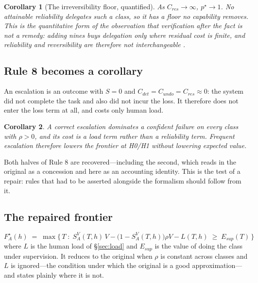 \documentclass[11pt]{article}
\newtheorem{corollary}{Corollary}
\theoremstyle{definition}
\newcommand{\pstar}{\ensuremath{p^{\star}}}
\begin{document}
\begin{corollary}[The irreversibility floor, quantified]\label{cor:floor}
As $C_{res}\to\infty$, $\pstar\to 1$. No attainable reliability delegates such a class, so it has a floor no capability removes. This is the quantitative form of the observation that verification after the fact is not a remedy: adding nines buys delegation only where residual cost is finite, and reliability and reversibility are therefore not interchangeable \citep{perrow1984}.
\end{corollary}

\subsection{Rule 8 becomes a corollary}

An escalation is an outcome with $S=0$ and $C_{det}=C_{undo}=C_{res}\approx 0$: the system did not complete the task and also did not incur the loss. It therefore does not enter the loss term at all, and costs only human load.

\begin{corollary}\label{cor:escalation}
A correct escalation dominates a confident failure on every class with $\rho>0$, and its cost is a load term rather than a reliability term. Frequent escalation therefore lowers the frontier at H0/H1 without lowering expected value.
\end{corollary}

Both halves of Rule 8 are recovered---including the second, which reads in the original as a concession and here as an accounting identity. This is the test of a repair: rules that had to be asserted alongside the formalism should follow from it.

\subsection{The repaired frontier}\label{sec:repaired}

\begin{equation}
F^{\star}_A(h)\;=\;\max\Big\{\,T \;:\; S^V_A(T,h)\,V-\big(1-S^V_A(T,h)\big)\rho V - L(T,h)\;\ge\;E_{sup}(T)\,\Big\}
\end{equation}
where $L$ is the human load of \S\ref{sec:load} and $E_{sup}$ is the value of doing the class under supervision. It reduces to the original when $\rho$ is constant across classes and $L$ is ignored---the condition under which the original is a good approximation---and states plainly where it is not.
\end{document}
